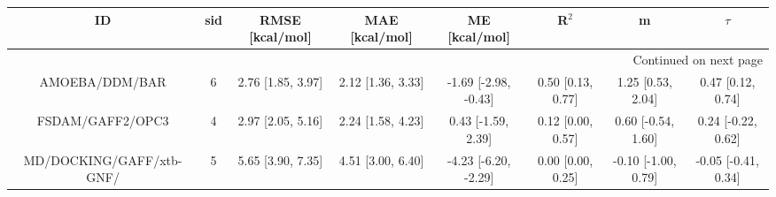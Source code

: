 \documentclass[8pt]{article}
\begin{document}
\begin{center}
\begin{footnotesize}
\begin{longtable}{|cccccccc|}
\toprule
                       ID & sid &    RMSE [kcal/mol] &     MAE [kcal/mol] &         ME [kcal/mol] &              R$^2$ &                    m &               $\tau$ \\
\midrule
\endhead
\midrule
\multicolumn{8}{r}{{Continued on next page}} \\
\midrule
\endfoot

\bottomrule
\endlastfoot
           AMOEBA/DDM/BAR &   6 &  2.76 [1.85, 3.97] &  2.12 [1.36, 3.33] &  -1.69 [-2.98, -0.43] &  0.50 [0.13, 0.77] &    1.25 [0.53, 2.04] &    0.47 [0.12, 0.74] \\
         FSDAM/GAFF2/OPC3 &   4 &  2.97 [2.05, 5.16] &  2.24 [1.58, 4.23] &    0.43 [-1.59, 2.39] &  0.12 [0.00, 0.57] &   0.60 [-0.54, 1.60] &   0.24 [-0.22, 0.62] \\
 MD/DOCKING/GAFF/xtb-GNF/ &   5 &  5.65 [3.90, 7.35] &  4.51 [3.00, 6.40] &  -4.23 [-6.20, -2.29] &  0.00 [0.00, 0.25] &  -0.10 [-1.00, 0.79] &  -0.05 [-0.41, 0.34] \\
\end{longtable}
\end{footnotesize}
\end{center}
\end{document}
